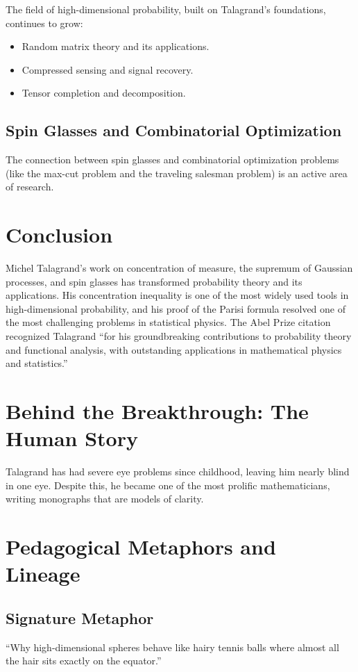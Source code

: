 The field of high-dimensional probability, built on Talagrand's foundations, continues to grow:
\begin{itemize}
\item Random matrix theory and its applications.
\item Compressed sensing and signal recovery.
\item Tensor completion and decomposition.
\end{itemize}

\subsection{Spin Glasses and Combinatorial Optimization}

The connection between spin glasses and combinatorial optimization problems (like the max-cut problem and the traveling salesman problem) is an active area of research.

\section{Conclusion}

Michel Talagrand's work on concentration of measure, the supremum of Gaussian processes, and spin glasses has transformed probability theory and its applications. His concentration inequality is one of the most widely used tools in high-dimensional probability, and his proof of the Parisi formula resolved one of the most challenging problems in statistical physics. The Abel Prize citation recognized Talagrand ``for his groundbreaking contributions to probability theory and functional analysis, with outstanding applications in mathematical physics and statistics.''

\section{Behind the Breakthrough: The Human Story}
Talagrand has had severe eye problems since childhood, leaving him nearly blind in one eye. Despite this, he became one of the most prolific mathematicians, writing monographs that are models of clarity.

\section{Pedagogical Metaphors and Lineage}
\subsection{Signature Metaphor}
``Why high-dimensional spheres behave like hairy tennis balls where almost all the hair sits exactly on the equator.''

